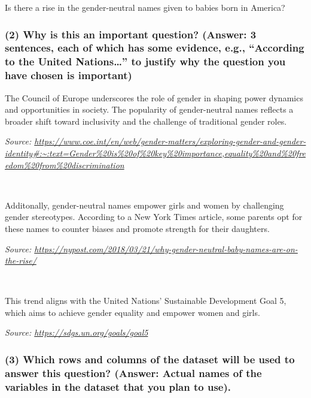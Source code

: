 \documentclass[
]{article}
\begin{document}
Is there a rise in the gender-neutral names given to babies born in
America?

\hypertarget{why-is-this-an-important-question-answer-3-sentences-each-of-which-has-some-evidence-e.g.-according-to-the-united-nations-to-justify-why-the-question-you-have-chosen-is-important}{%
\subsubsection{\texorpdfstring{(2) Why is this an important question?
(Answer: 3 sentences, each of which has some evidence, e.g., ``According
to the United Nations\ldots{}'' to justify why the question you have
chosen is
important)}{(2) Why is this an important question? (Answer: 3 sentences, each of which has some evidence, e.g., ``According to the United Nations\ldots'' to justify why the question you have chosen is important)}}\label{why-is-this-an-important-question-answer-3-sentences-each-of-which-has-some-evidence-e.g.-according-to-the-united-nations-to-justify-why-the-question-you-have-chosen-is-important}}

The Council of Europe underscores the role of gender in shaping power
dynamics and opportunities in society. The popularity of gender-neutral
names reflects a broader shift toward inclusivity and the challenge of
traditional gender roles.

\emph{Source:
\url{https://www.coe.int/en/web/gender-matters/exploring-gender-and-gender-identity\#:~:text=Gender\%20is\%20of\%20key\%20importance,equality\%20and\%20freedom\%20from\%20discrimination}}

~

Additonally, gender-neutral names empower girls and women by challenging
gender stereotypes. According to a New York Times article, some parents
opt for these names to counter biases and promote strength for their
daughters.

\emph{Source:
\url{https://nypost.com/2018/03/21/why-gender-neutral-baby-names-are-on-the-rise/}}

~

This trend aligns with the United Nations' Sustainable Development Goal
5, which aims to achieve gender equality and empower women and girls.

\emph{Source: \url{https://sdgs.un.org/goals/goal5}}

\hypertarget{which-rows-and-columns-of-the-dataset-will-be-used-to-answer-this-question-answer-actual-names-of-the-variables-in-the-dataset-that-you-plan-to-use.}{%
\subsubsection{(3) Which rows and columns of the dataset will be used to
answer this question? (Answer: Actual names of the variables in the
dataset that you plan to
use).}\label{which-rows-and-columns-of-the-dataset-will-be-used-to-answer-this-question-answer-actual-names-of-the-variables-in-the-dataset-that-you-plan-to-use.}}
\end{document}

